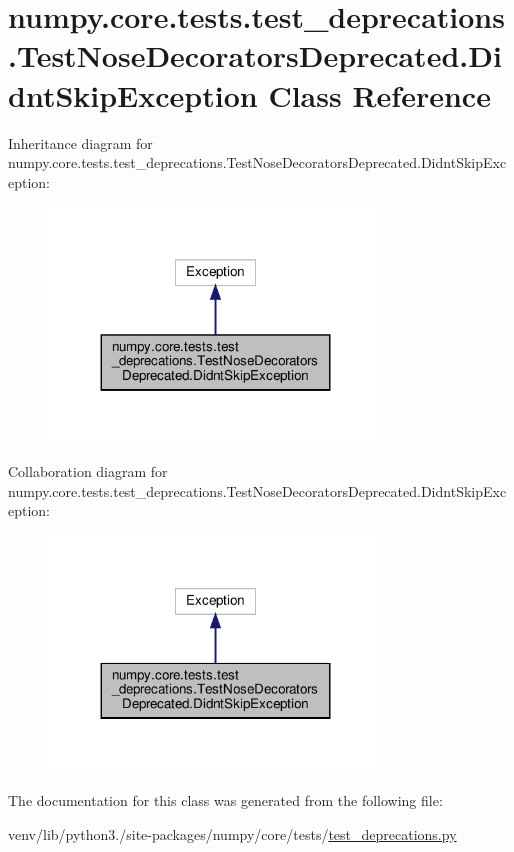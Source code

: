 \hypertarget{classnumpy_1_1core_1_1tests_1_1test__deprecations_1_1TestNoseDecoratorsDeprecated_1_1DidntSkipException}{}\section{numpy.\+core.\+tests.\+test\+\_\+deprecations.\+Test\+Nose\+Decorators\+Deprecated.\+Didnt\+Skip\+Exception Class Reference}
\label{classnumpy_1_1core_1_1tests_1_1test__deprecations_1_1TestNoseDecoratorsDeprecated_1_1DidntSkipException}


Inheritance diagram for numpy.\+core.\+tests.\+test\+\_\+deprecations.\+Test\+Nose\+Decorators\+Deprecated.\+Didnt\+Skip\+Exception\+:
\nopagebreak
\begin{figure}[H]
\begin{center}
\leavevmode
\includegraphics[width=251pt]{classnumpy_1_1core_1_1tests_1_1test__deprecations_1_1TestNoseDecoratorsDeprecated_1_1DidntSkipException__inherit__graph}
\end{center}
\end{figure}


Collaboration diagram for numpy.\+core.\+tests.\+test\+\_\+deprecations.\+Test\+Nose\+Decorators\+Deprecated.\+Didnt\+Skip\+Exception\+:
\nopagebreak
\begin{figure}[H]
\begin{center}
\leavevmode
\includegraphics[width=251pt]{classnumpy_1_1core_1_1tests_1_1test__deprecations_1_1TestNoseDecoratorsDeprecated_1_1DidntSkipException__coll__graph}
\end{center}
\end{figure}


The documentation for this class was generated from the following file\+:\begin{DoxyCompactItemize}
\item 
venv/lib/python3./site-\/packages/numpy/core/tests/\hyperlink{core_2tests_2test__deprecations_8py}{test\+\_\+deprecations.\+py}\end{DoxyCompactItemize}
